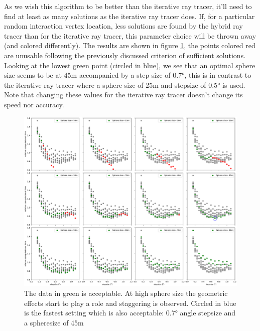 As we wish this algorithm to be better than the iterative ray tracer, it'll
need to find at least as many solutions as the iterative ray tracer does.  If,
for a particular random interaction vertex location, less solutions are found
by the hybrid ray tracer than for the iterative ray tracer, this parameter
choice will be thrown away (and colored differently).  The results are shown in
figure \ref{fig:SphereStepInfl}, the points colored red are unusable following
the previously discussed criterion of sufficient solutions.  Looking at the
lowest green point (circled in blue), we see that an optimal sphere size seems
to be at 45m accompanied by a step size of 0.7°, this is in contrast to the
iterative ray tracer where a sphere size of 25m and stepsize of 0.5° is used.
Note that changing these values for the iterative ray tracer doesn't change its
speed nor accuracy.
\begin{figure}
\centering
\includegraphics[width=\textwidth]{figures/subplotofallstepsphere.pdf}
\caption{The data in green is acceptable. At high sphere size the geometric effects start to play a role and staggering is observed. Circled in blue is the fastest setting which is also acceptable: 
0.7° angle stepsize and a spheresize of 45m}
\label{fig:SphereStepInfl}
\end{figure}
